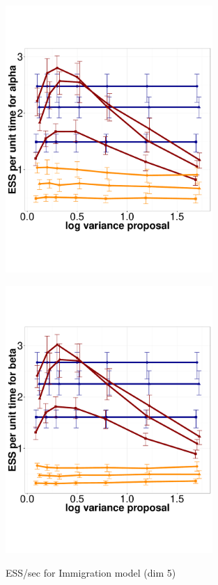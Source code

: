   \begin{figure}%
  \centering
  \begin{minipage}[!hp]{0.45\linewidth}
  \centering
    \includegraphics [width=0.70\textwidth, angle=0]{figs/q_5_alpha.pdf}
      \end{minipage}
  \begin{minipage}[!hp]{0.45\linewidth}
  \centering
    \includegraphics [width=0.70\textwidth, angle=0]{figs/q_5_beta.pdf}
    \vspace{-0 in}
     \label{fig:ESS_Q_5}
  \end{minipage}
    \caption{ESS/sec for Immigration model (dim 5)}
  \end{figure}

